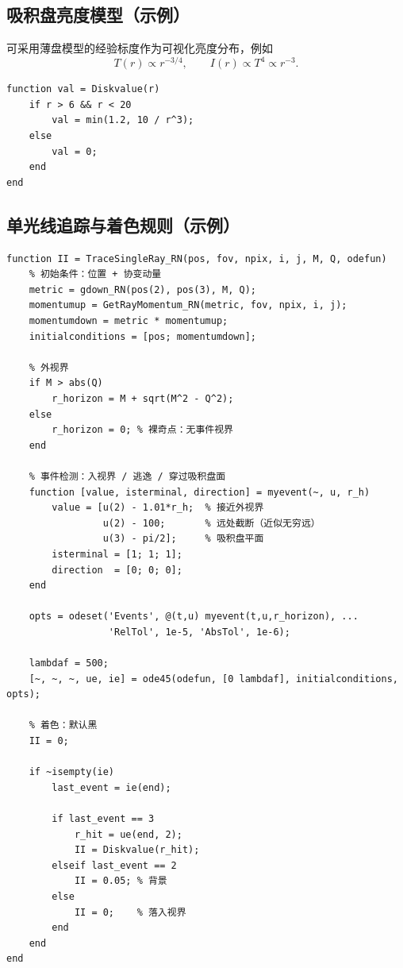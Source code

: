 \documentclass[a4paper,12pt]{article}
\begin{document}
\subsection{吸积盘亮度模型（示例）}

可采用薄盘模型的经验标度作为可视化亮度分布，例如
\begin{equation}
T(r)\propto r^{-3/4},\qquad I(r)\propto T^4\propto r^{-3}.
\end{equation}

\begin{lstlisting}[caption={吸积盘亮度函数 \texttt{Diskvalue}}]
function val = Diskvalue(r)
    if r > 6 && r < 20
        val = min(1.2, 10 / r^3);
    else
        val = 0;
    end
end
\end{lstlisting}

\subsection{单光线追踪与着色规则（示例）}

\begin{lstlisting}[caption={单光线追踪 \texttt{TraceSingleRay\_RN}}]
function II = TraceSingleRay_RN(pos, fov, npix, i, j, M, Q, odefun)
    % 初始条件：位置 + 协变动量
    metric = gdown_RN(pos(2), pos(3), M, Q);
    momentumup = GetRayMomentum_RN(metric, fov, npix, i, j);
    momentumdown = metric * momentumup;
    initialconditions = [pos; momentumdown];

    % 外视界
    if M > abs(Q)
        r_horizon = M + sqrt(M^2 - Q^2);
    else
        r_horizon = 0; % 裸奇点：无事件视界
    end

    % 事件检测：入视界 / 逃逸 / 穿过吸积盘面
    function [value, isterminal, direction] = myevent(~, u, r_h)
        value = [u(2) - 1.01*r_h;  % 接近外视界
                 u(2) - 100;       % 远处截断（近似无穷远）
                 u(3) - pi/2];     % 吸积盘平面
        isterminal = [1; 1; 1];
        direction  = [0; 0; 0];
    end

    opts = odeset('Events', @(t,u) myevent(t,u,r_horizon), ...
                  'RelTol', 1e-5, 'AbsTol', 1e-6);

    lambdaf = 500;
    [~, ~, ~, ue, ie] = ode45(odefun, [0 lambdaf], initialconditions, opts);

    % 着色：默认黑
    II = 0;

    if ~isempty(ie)
        last_event = ie(end);

        if last_event == 3
            r_hit = ue(end, 2);
            II = Diskvalue(r_hit);
        elseif last_event == 2
            II = 0.05; % 背景
        else
            II = 0;    % 落入视界
        end
    end
end
\end{lstlisting}
\end{document}

